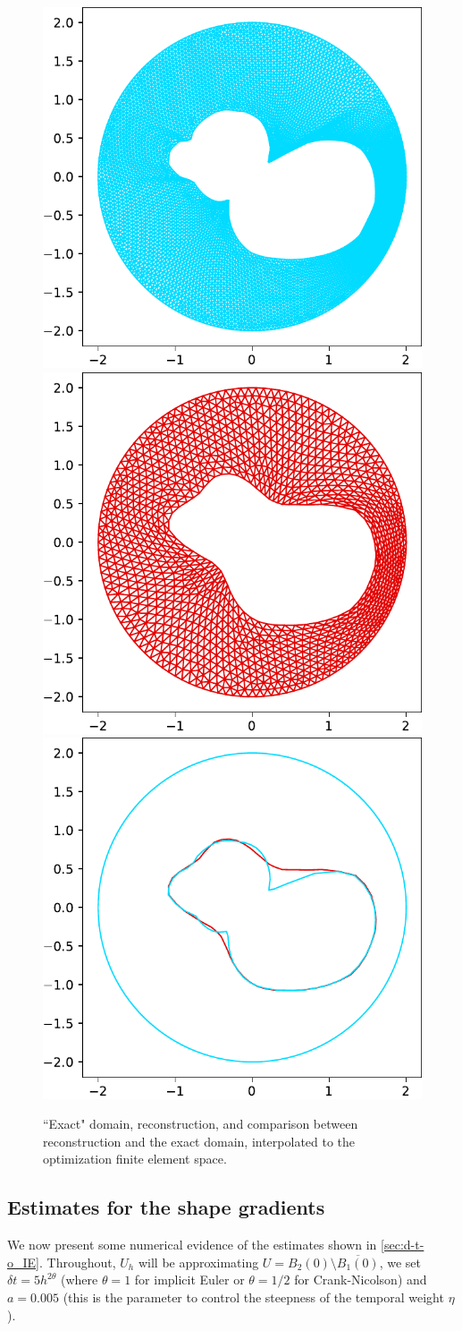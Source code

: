 \documentclass[english,a4paper,9pt,oneside]{scrbook}	%
\theoremstyle{break}
\theoremstyle{remark}
\newcommand{\tred}[1]{\textcolor{red}{#1}}
\begin{document}
\begin{figure}[H]
\centering
\includegraphics[height=0.3\columnwidth]{Images/duck/exact_domain.pdf}
\includegraphics[height=0.3\columnwidth]{Images/duck/estimated_domain.pdf}
\includegraphics[height=0.3\columnwidth]{Images/duck/comparison.pdf}
\caption{``Exact" domain, reconstruction, and comparison between reconstruction and the exact domain, interpolated to the optimization finite element space.}\label{fig:duck}
\end{figure}


\subsection{Estimates for the shape gradients}

We now present some numerical evidence of the estimates shown in \cref{sec:d-t-o_IE}. Throughout, $U_h$ will be approximating $U = B_2(0)\setminus \overline{B_1(0)}$, we set $\delta t = 5 h^{2\theta}$ (where $\theta=1$ for implicit Euler or $\theta=1/2$ for Crank-Nicolson) and $a = 0.005$ (this is the parameter to control the steepness of the temporal weight $\eta$).
\end{document}
